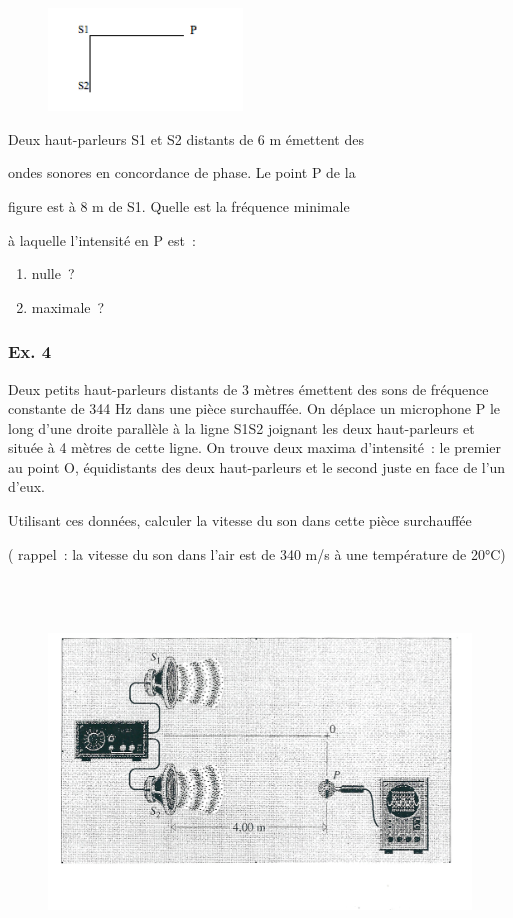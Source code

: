 {\begin{figure}
\centering
\includegraphics[width=5.151cm,height=2.729cm]{Pictures/10000001000000BC000000630AF71C86AA2A0A65.png}
\caption{}
\end{figure}

Deux haut-parleurs S1 et S2 distants de 6 m émettent des

ondes sonores en concordance de phase. Le point P de la

figure est à 8 m de S1. Quelle est la fréquence minimale

à laquelle l'intensité en P est~:

\begin{enumerate}
\item  nulle~?
\item  maximale~?
\end{enumerate}

\subsubsection{Ex. 4}

Deux petits haut-parleurs distants de 3 mètres émettent des sons de
fréquence constante de 344 Hz dans une pièce surchauffée. On déplace un
microphone P le long d'une droite parallèle à la ligne S1S2 joignant les
deux haut-parleurs et située à 4 mètres de cette ligne. On trouve deux
maxima d'intensité~: le premier au point O, équidistants des deux
haut-parleurs et le second juste en face de l'un d'eux.

Utilisant ces données, calculer la vitesse du son dans cette pièce
surchauffée

( rappel~: la vitesse du son dans l'air est de 340 m/s à une température
de 20°C)

\begin{figure}
\centering
\includegraphics[width=15.663cm,height=10.231cm]{Pictures/100000010000062500000404B4675BF2C4CE1EEC.png}
\caption{}
\end{figure}

}
